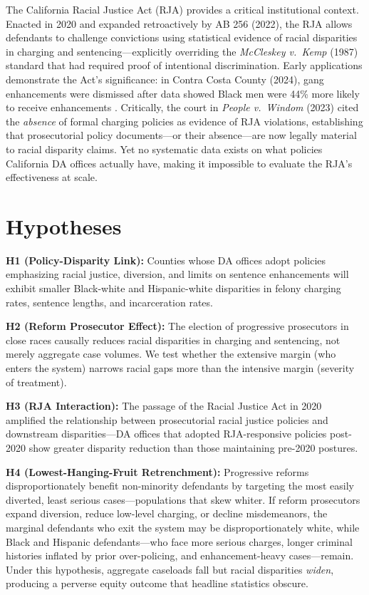 \documentclass[12pt]{article}
\begin{document}
The California Racial Justice Act (RJA) provides a critical institutional context. Enacted in 2020 and expanded retroactively by AB 256 (2022), the RJA allows defendants to challenge convictions using statistical evidence of racial disparities in charging and sentencing---explicitly overriding the \textit{McCleskey v.\ Kemp} (1987) standard that had required proof of intentional discrimination. Early applications demonstrate the Act's significance: in Contra Costa County (2024), gang enhancements were dismissed after data showed Black men were 44\% more likely to receive enhancements \citep{byrne2025}. Critically, the court in \textit{People v.\ Windom} (2023) cited the \textit{absence} of formal charging policies as evidence of RJA violations, establishing that prosecutorial policy documents---or their absence---are now legally material to racial disparity claims. Yet no systematic data exists on what policies California DA offices actually have, making it impossible to evaluate the RJA's effectiveness at scale.

\section{Hypotheses}

\textbf{H1 (Policy-Disparity Link):} Counties whose DA offices adopt policies emphasizing racial justice, diversion, and limits on sentence enhancements will exhibit smaller Black-white and Hispanic-white disparities in felony charging rates, sentence lengths, and incarceration rates.

\textbf{H2 (Reform Prosecutor Effect):} The election of progressive prosecutors in close races causally reduces racial disparities in charging and sentencing, not merely aggregate case volumes. We test whether the extensive margin (who enters the system) narrows racial gaps more than the intensive margin (severity of treatment).

\textbf{H3 (RJA Interaction):} The passage of the Racial Justice Act in 2020 amplified the relationship between prosecutorial racial justice policies and downstream disparities---DA offices that adopted RJA-responsive policies post-2020 show greater disparity reduction than those maintaining pre-2020 postures.

\textbf{H4 (Lowest-Hanging-Fruit Retrenchment):} Progressive reforms disproportionately benefit non-minority defendants by targeting the most easily diverted, least serious cases---populations that skew whiter. If reform prosecutors expand diversion, reduce low-level charging, or decline misdemeanors, the marginal defendants who exit the system may be disproportionately white, while Black and Hispanic defendants---who face more serious charges, longer criminal histories inflated by prior over-policing, and enhancement-heavy cases---remain. Under this hypothesis, aggregate caseloads fall but racial disparities \textit{widen}, producing a perverse equity outcome that headline statistics obscure.
\end{document}
